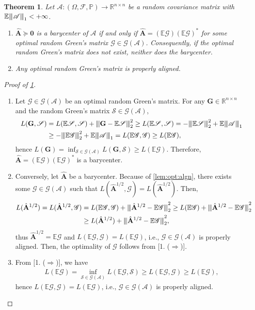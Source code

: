 \documentclass[noinfoline]{imsart}\setcounter{tocdepth}{2}
\renewcommand{\b}[1]{\mathbb{#1}} %
\newcommand{\m}[1]{\mathbf{#1}} %
\newcommand{\s}[1]{\mathscr{#1}} %
\renewcommand{\c}[1]{\mathcal{#1}} %
\newcommand{\vertiii}[1]{{\left\vert\kern-0.25ex\left\vert\kern-0.25ex\left\vert #1 
    \right\vert\kern-0.25ex\right\vert\kern-0.25ex\right\vert}} %
\newcommand{\vertii}[1]{{\vert\kern-0.25ex\vert\kern-0.25ex\vert #1 
    \vert\kern-0.25ex\vert\kern-0.25ex\vert}} %
\theoremstyle{plain}
\newtheorem{theorem}{Theorem}[section]
\begin{document}
\begin{theorem}\label{thm:char:barycenter}
Let $\s{A}: (\Omega, \s{F}, \b{P}) \to \b{R}^{n \times n}$ be a random covariance matrix with $\b{E} \vertiii{\s{A}}_{1} < +\infty$.
\begin{enumerate}[leftmargin = *]
\item $\hat{\m{A}} \succeq \m{0}$ is a barycenter of $\s{A}$ if and only if $\hat{\m{A}} = (\b{E} \s{G}) (\b{E} \s{G})^{*}$ for some optimal random Green's matrix $\s{G} \in \c{G}(\s{A})$. Consequently, if the optimal random Green's matrix does not exist, neither does the barycenter.
\item Any optimal random Green's matrix is properly aligned.
\end{enumerate}
\end{theorem}
\begin{proof}[Proof of \cref{thm:char:barycenter}] \quad
\begin{enumerate}
\item [1. ($\Rightarrow$)] Let $\s{G} \in \c{G}(\s{A})$ be an optimal random Green's matrix. For any $\m{G} \in \b{R}^{n \times n}$ and the random Green's matrix $\s{S} \in \c{G}(\s{A})$,
\begin{align*}
    L(\m{G}, \s{S}) &= L(\b{E} \s{S}, \s{S}) + \vertii{\m{G} - \b{E} \s{S}}_{2}^{2} \ge L(\b{E} \s{S}, \s{S}) = -\vertii{\b{E} \s{S}}_{2}^{2} + \b{E} \vertii{\s{A}}_{1} \\
    &\ge - \vertii{\b{E} \s{G}}_{2}^{2} + \b{E} \vertii{\s{A}}_{1} = L(\b{E} \s{G}, \s{G}) \ge L(\b{E} \s{G}),
\end{align*}
hence $L(\m{G}) = \inf_{\s{S} \in \c{G}(\s{A})} L(\m{G}, \s{S}) \ge L(\b{E} \s{G})$. Therefore, $\hat{\m{A}} = (\b{E} \s{G}) (\b{E} \s{G})^{*}$ is a barycenter.

\item [1. ($\Leftarrow$)] Conversely, let $\hat{\m{A}}$ be a barycenter. Because of \cref{lem:opt:algn}, there exists some $\s{G} \in \c{G}(\s{A})$ such that $L(\hat{\m{A}}^{1/2}, \s{G}) = L(\hat{\m{A}}^{1/2})$. Then,
\begin{align*}
    L(\hat{\m{A}}^{1/2}) = L(\hat{\m{A}}^{1/2}, \s{G}) &= L(\b{E} \s{G}, \s{G}) + \vertii{\hat{\m{A}}^{1/2} - \b{E} \s{G}}_{2}^{2} \ge L(\b{E} \s{G}) + \vertii{\hat{\m{A}}^{1/2} - \b{E} \s{G}}_{2}^{2} \\
    &\ge L(\hat{\m{A}}^{1/2}) + \vertii{\hat{\m{A}}^{1/2} - \b{E} \s{G}}_{2}^{2},
\end{align*}
thus $\hat{\m{A}}^{1/2} = \b{E} \s{G}$ and $L(\b{E} \s{G}, \s{G}) = L(\b{E} \s{G})$, i.e., $\s{G} \in \c{G}(\s{A})$ is properly aligned. Then, the optimality of $\s{G}$ follows from [1. ($\Rightarrow$)].

\item [2.] From [1. ($\Rightarrow$)], we have
\begin{align*}
    L(\b{E} \s{G}) = \inf_{\s{S} \in \c{G}(\s{A})} L(\b{E} \s{G}, \s{S}) \ge L(\b{E} \s{G}, \s{G}) \ge L(\b{E} \s{G}),
\end{align*}
hence $L(\b{E} \s{G}, \s{G}) = L(\b{E} \s{G})$, i.e., $\s{G} \in \c{G}(\s{A})$ is properly aligned. 
\end{enumerate}
\end{proof}
\end{document}
